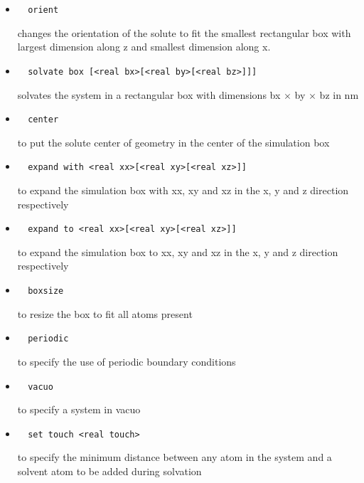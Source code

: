 \begin{itemize}
\item
\begin{verbatim}
  orient
\end{verbatim}
changes the orientation of the solute to fit the smallest rectangular
box with largest dimension along z and smallest dimension along x.

\item
\begin{verbatim}
  solvate box [<real bx>[<real by>[<real bz>]]]
\end{verbatim}
solvates the system in a rectangular box with dimensions 
bx $\times$ by $\times$ bz in nm

\item
\begin{verbatim}
  center
\end{verbatim}
to put the solute center of geometry in the center of the
simulation box

\item
\begin{verbatim}
  expand with <real xx>[<real xy>[<real xz>]]
\end{verbatim}
to expand the simulation box with xx, xy and xz in the
x, y and z direction respectively

\item
\begin{verbatim}
  expand to <real xx>[<real xy>[<real xz>]]
\end{verbatim}
to expand the simulation box to xx, xy and xz in the
x, y and z direction respectively

\item
\begin{verbatim}
  boxsize
\end{verbatim}
to resize the box to fit all atoms present

\item
\begin{verbatim}
  periodic
\end{verbatim}
to specify the use of periodic boundary conditions

\item
\begin{verbatim}
  vacuo
\end{verbatim}
to specify a system in vacuo

\item
\begin{verbatim}
  set touch <real touch>
\end{verbatim}
to specify the minimum distance between any atom in
the system and a solvent atom to be added during solvation


\end{itemize}
